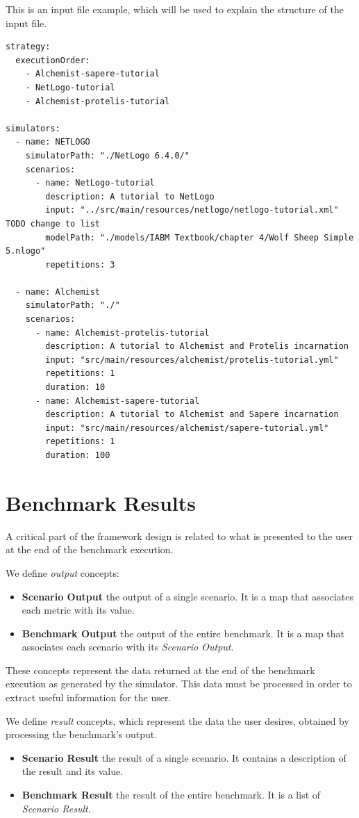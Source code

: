 \documentclass[12pt,a4paper,openright,twoside]{book}
\begin{document}
This is an input file example, which will be used to explain the structure of the input file.
\begin{lstlisting}[style=yaml]
strategy:
  executionOrder:
    - Alchemist-sapere-tutorial
    - NetLogo-tutorial
    - Alchemist-protelis-tutorial

simulators:
  - name: NETLOGO
    simulatorPath: "./NetLogo 6.4.0/"
    scenarios:
      - name: NetLogo-tutorial
        description: A tutorial to NetLogo
        input: "../src/main/resources/netlogo/netlogo-tutorial.xml" TODO change to list
        modelPath: "./models/IABM Textbook/chapter 4/Wolf Sheep Simple 5.nlogo"
        repetitions: 3

  - name: Alchemist
    simulatorPath: "./"
    scenarios:
      - name: Alchemist-protelis-tutorial
        description: A tutorial to Alchemist and Protelis incarnation
        input: "src/main/resources/alchemist/protelis-tutorial.yml"
        repetitions: 1
        duration: 10
      - name: Alchemist-sapere-tutorial
        description: A tutorial to Alchemist and Sapere incarnation
        input: "src/main/resources/alchemist/sapere-tutorial.yml"
        repetitions: 1
        duration: 100
\end{lstlisting}

\section{Benchmark Results}

A critical part of the framework design is related to what is presented to the user at the end of the benchmark execution.

We define \emph{output} concepts:
\begin{itemize}
  \item \textbf{Scenario Output} the output of a single scenario. It is a map that associates each metric with its value.
  \item \textbf{Benchmark Output} the output of the entire benchmark. It is a map that associates each scenario with its \emph{Scenario Output}.
\end{itemize}

These concepts represent the data returned at the end of the benchmark execution as generated by the simulator.
This data must be processed in order to extract useful information for the user.

We define \emph{result} concepts, which represent the data the user desires, obtained by processing the benchmark's output.
\begin{itemize}
  \item \textbf{Scenario Result} the result of a single scenario. It contains a description of the result and its value.
  \item \textbf{Benchmark Result} the result of the entire benchmark. It is a list of \emph{Scenario Result}.
\end{itemize}
\end{document}
